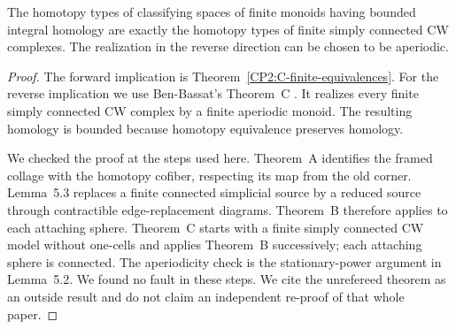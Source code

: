 \begin{corollary}
\label{CP2:C-characterization}
The homotopy types of classifying spaces of finite monoids having
bounded integral homology are exactly the homotopy types of finite
simply connected CW complexes.  The realization in the reverse
direction can be chosen to be aperiodic.
\end{corollary}
\begin{proof}
The forward implication is Theorem~\ref{CP2:C-finite-equivalences}.
For the reverse implication we use Ben-Bassat's Theorem~C
\cite{CP2-BenBassat2026}.  It realizes every finite simply connected
CW complex by a finite aperiodic monoid.  The resulting homology is
bounded because homotopy equivalence preserves homology.

We checked the proof at the steps used here.  Theorem~A identifies
the framed collage with the homotopy cofiber, respecting its map
from the old corner.  Lemma~5.3 replaces a finite connected
simplicial source by a reduced source through contractible
edge-replacement diagrams.  Theorem~B therefore applies to each
attaching sphere.  Theorem~C starts with a finite simply connected
CW model without one-cells and applies Theorem~B successively; each
attaching sphere is connected.  The aperiodicity check is the
stationary-power argument in Lemma~5.2.  We found no fault in these
steps.  We cite the unrefereed theorem as an outside result and do
not claim an independent re-proof of that whole paper.
\end{proof}

